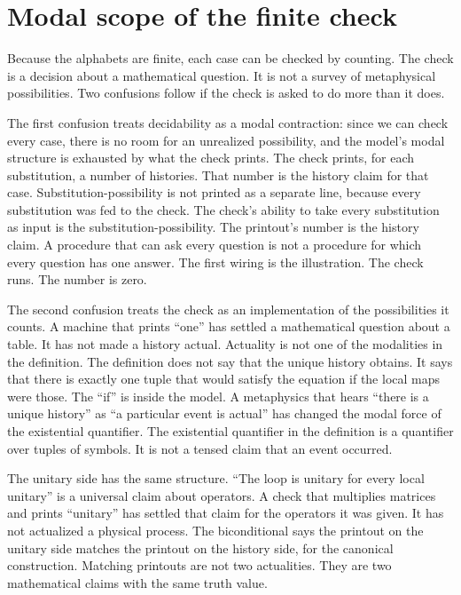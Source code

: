 \documentclass[11pt]{article}
\begin{document}
\section{Modal scope of the finite check}
\label{sec:scope}

Because the alphabets are finite, each case can be checked by counting. The check is a decision about a mathematical question. It is not a survey of metaphysical possibilities. Two confusions follow if the check is asked to do more than it does.

The first confusion treats decidability as a modal contraction: since we can check every case, there is no room for an unrealized possibility, and the model's modal structure is exhausted by what the check prints. The check prints, for each substitution, a number of histories. That number is the history claim for that case. Substitution-possibility is not printed as a separate line, because every substitution was fed to the check. The check's ability to take every substitution as input is the substitution-possibility. The printout's number is the history claim. A procedure that can ask every question is not a procedure for which every question has one answer. The first wiring is the illustration. The check runs. The number is zero.

The second confusion treats the check as an implementation of the possibilities it counts. A machine that prints ``one'' has settled a mathematical question about a table. It has not made a history actual. Actuality is not one of the modalities in the definition. The definition does not say that the unique history obtains. It says that there is exactly one tuple that would satisfy the equation if the local maps were those. The ``if'' is inside the model. A metaphysics that hears ``there is a unique history'' as ``a particular event is actual'' has changed the modal force of the existential quantifier. The existential quantifier in the definition is a quantifier over tuples of symbols. It is not a tensed claim that an event occurred.

The unitary side has the same structure. ``The loop is unitary for every local unitary'' is a universal claim about operators. A check that multiplies matrices and prints ``unitary'' has settled that claim for the operators it was given. It has not actualized a physical process. The biconditional says the printout on the unitary side matches the printout on the history side, for the canonical construction. Matching printouts are not two actualities. They are two mathematical claims with the same truth value.
\end{document}
